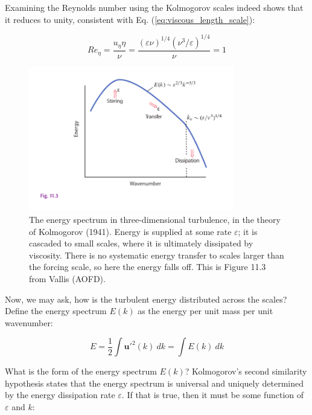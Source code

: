 \documentclass[12pt]{article}
\numberwithin{equation}{section}
\numberwithin{figure}{section}
\numberwithin{table}{section}
\begin{document}
Examining the Reynolds number using the Kolmogorov scales indeed shows that
it reduces to unity, consistent with Eq. (\ref{eq:viscous_length_scale}):

\begin{equation}
  Re_\eta = \frac{u_\eta \eta}{\nu} = \frac{\left( \varepsilon \nu \right)^{1/4} \left( \nu^3/\varepsilon \right)^{1/4}}{\nu} = 1
\end{equation}

\begin{figure}[h]
  \centering
  \includegraphics[width=0.8\textwidth]{assets/fig_turbulent_spectrum_3d.pdf}
  \caption{
    The energy spectrum in three-dimensional turbulence, in the theory of
    Kolmogorov (1941). Energy is supplied at some rate $\varepsilon$;
    it is cascaded to small scales, where it is ultimately dissipated by
    viscosity.
    There is no systematic energy transfer to scales larger than the forcing
    scale, so here the energy falls off.
    This is Figure 11.3 from Vallis (AOFD).
  }
  \label{fig:turbulent_spectrum_3d}
\end{figure}

Now, we may ask, how is the turbulent energy distributed across the scales?
Define the energy spectrum $E(k)$ as the energy per unit mass per unit wavenumber:

\begin{equation}
  E = \frac{1}{2} \int \mathbf{u}'^2(k)\ dk = \int E(k)\ dk
\end{equation}

What is the form of the energy spectrum $E(k)$?
Kolmogorov's second similarity hypothesis states that the energy spectrum is
universal and uniquely determined by the energy dissipation rate $\varepsilon$.
If that is true, then it must be some function of $\varepsilon$ and $k$:
\end{document}
